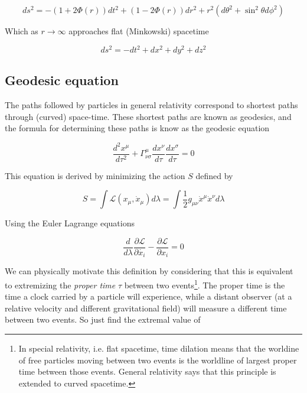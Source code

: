 \begin{equation}
    ds^2 = - (1+2\Phi(r)) dt^2 +  (1-2\Phi(r)) dr^2
            + r^2 (d\theta^2+\sin^2\theta d\phi^2)
\label{eq:Weak field metric}
\end{equation}

Which as $r\rightarrow \infty$ approaches flat (Minkowski) spacetime

\begin{equation}
    ds^2 = - dt^2 + dx^2 + dy^2 + dz^2
\label{eq:Minkowski metruc}
\end{equation}



\subsection{Geodesic equation}

The paths followed by particles in general relativity correspond to shortest paths through (curved) space-time. These shortest paths are known as geodesics, and the formula for determining these paths is know as the geodesic equation

\begin{equation}
    \frac{d^2x^{\mu}}{d\tau^2} + \Gamma^{\mu}_{\nu \sigma} \frac{dx^{\nu}}{d\tau} \frac{dx^{\sigma}}{d\tau} = 0
\label{eq:Geodesic equation}
\end{equation}

This equation is derived by minimizing the action $S$ defined by

\newcommand{\Lagr}{\mathcal{L}}

\begin{equation}
    S = \int \mathcal{L}(x_\mu,\dot{x}_\mu) d\lambda = \int \frac{1}{2} g_{\mu \nu} \dot{x}^\mu \dot{x}^\nu d\lambda 
\label{eq:Invariant distance action}
\end{equation}

Using the Euler Lagrange equations

\begin{equation}
    \frac{d}{d\lambda} \frac{\partial \mathcal{L}}{\partial \dot{x_i}} - \frac{\partial \mathcal{L}}{\partial x_i} = 0
\label{eq:Euler-Lagrange equation}
\end{equation}

We can physically motivate this definition by considering that this is equivalent to extremizing the \textit{proper time} $\tau$ between two events\footnote{In special relativity, i.e. flat spacetime, time dilation means that the worldine of free particles moving between two events is the worldline of largest proper time between those events. General relativity says that this principle is extended to curved spacetime.}. The proper time is the time a clock carried by a particle will experience, while a distant observer (at a relative velocity and different gravitational field) will measure a different time between two events. So just find the extremal value of

